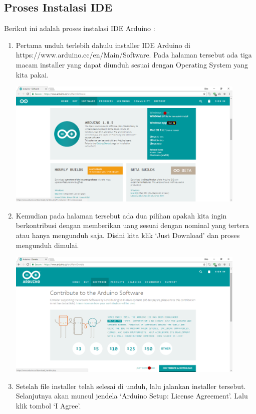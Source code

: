 \subsection{Proses Instalasi IDE}

Berikut ini adalah proses instalasi IDE Arduino :

\begin{enumerate}
\item Pertama unduh terlebih dahulu installer IDE Arduino di https://www.arduino.cc/en/Main/Software. Pada halaman tersebut ada tiga macam installer yang dapat diunduh sesuai dengan Operating System yang kita pakai.
\break\\
\centerline{\includegraphics[width=0.9\textwidth]{figures/aride8.png}}
\item Kemudian pada halaman tersebut ada dua pilihan apakah kita ingin berkontribusi dengan memberikan uang sesuai dengan nominal yang tertera atau hanya mengunduh saja. Disini kita klik `Just Download' dan proses mengunduh dimulai.
\break\\
\centerline{\includegraphics[width=0.9\textwidth]{figures/aride9.png}}
\item Setelah file installer telah selesai di unduh, lalu jalankan installer tersebut. Selanjutnya akan muncul jendela `Arduino Setup: License Agreement'. Lalu klik tombol `I Agree'.

\end{enumerate}
